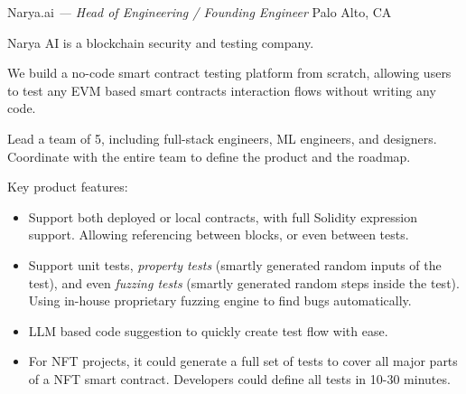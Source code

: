 \documentclass[]{friggeri-cv} %
\begin{document}
\begin{entrylist}
  {Narya.ai \emph{--- Head of Engineering / Founding Engineer}}
  {Palo Alto, CA}
  {
    Narya AI is a blockchain security and testing company.

    We build a no-code smart contract testing platform from scratch,
    allowing users to test any EVM based smart contracts interaction flows without writing any code.

    Lead a team of 5, including full-stack engineers, ML engineers, and designers.
    Coordinate with the entire team to define the product and the roadmap.

    Key product features:
    \begin{itemize}
      \item Support both deployed or local contracts, with full Solidity expression support.
      Allowing referencing between blocks, or even between tests.
      \item Support unit tests, \emph{property tests} (smartly generated random inputs of the test),
      and even \emph{fuzzing tests} (smartly generated random steps inside the test).
      Using in-house proprietary fuzzing engine to find bugs automatically.
      \item LLM based code suggestion to quickly create test flow with ease.
      \item For NFT projects, it could generate a full set of tests to cover all major parts of a NFT smart contract.
      Developers could define all tests in 10-30 minutes.
    \end{itemize}

}
\end{entrylist}
\end{document}
